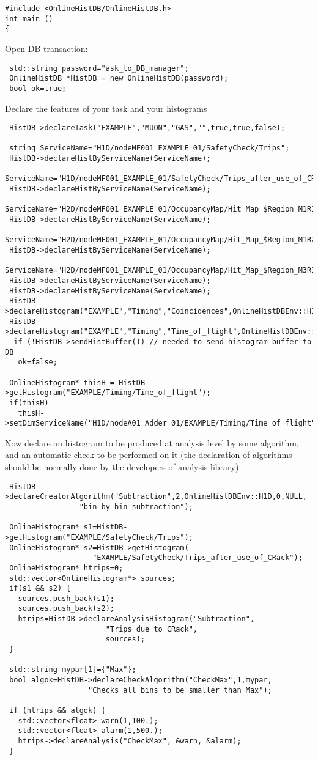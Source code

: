 \documentclass{lhcbnote}
\begin{document}
\begin{verbatim}
#include <OnlineHistDB/OnlineHistDB.h>
int main ()
{
\end{verbatim}
Open DB transaction:
\begin{verbatim}
 std::string password="ask_to_DB_manager";
 OnlineHistDB *HistDB = new OnlineHistDB(password);
 bool ok=true;
\end{verbatim}
Declare the features of your task and your histograms
\begin{verbatim}
 HistDB->declareTask("EXAMPLE","MUON","GAS","",true,true,false);

 string ServiceName="H1D/nodeMF001_EXAMPLE_01/SafetyCheck/Trips";
 HistDB->declareHistByServiceName(ServiceName);
 ServiceName="H1D/nodeMF001_EXAMPLE_01/SafetyCheck/Trips_after_use_of_CRack";
 HistDB->declareHistByServiceName(ServiceName);
 ServiceName="H2D/nodeMF001_EXAMPLE_01/OccupancyMap/Hit_Map_$Region_M1R1";
 HistDB->declareHistByServiceName(ServiceName); 
 ServiceName="H2D/nodeMF001_EXAMPLE_01/OccupancyMap/Hit_Map_$Region_M1R2";
 HistDB->declareHistByServiceName(ServiceName);
 ServiceName="H2D/nodeMF001_EXAMPLE_01/OccupancyMap/Hit_Map_$Region_M3R1";
 HistDB->declareHistByServiceName(ServiceName);
 HistDB->declareHistByServiceName(ServiceName);
 HistDB->declareHistogram("EXAMPLE","Timing","Coincidences",OnlineHistDBEnv::H1D);
 HistDB->declareHistogram("EXAMPLE","Timing","Time_of_flight",OnlineHistDBEnv::H1D);
  if (!HistDB->sendHistBuffer()) // needed to send histogram buffer to DB
   ok=false;

 OnlineHistogram* thisH = HistDB->getHistogram("EXAMPLE/Timing/Time_of_flight");
 if(thisH)
   thisH->setDimServiceName("H1D/nodeA01_Adder_01/EXAMPLE/Timing/Time_of_flight");
\end{verbatim}
Now declare an histogram to be produced at analysis level by some
algorithm, and an automatic check to be performed on it (the
declaration of algorithms should be normally done by the developers of analysis
library)  
\begin{verbatim}
 HistDB->declareCreatorAlgorithm("Subtraction",2,OnlineHistDBEnv::H1D,0,NULL,
				 "bin-by-bin subtraction");

 OnlineHistogram* s1=HistDB->getHistogram("EXAMPLE/SafetyCheck/Trips");
 OnlineHistogram* s2=HistDB->getHistogram(
                    "EXAMPLE/SafetyCheck/Trips_after_use_of_CRack");
 OnlineHistogram* htrips=0;
 std::vector<OnlineHistogram*> sources;
 if(s1 && s2) {
   sources.push_back(s1);
   sources.push_back(s2);
   htrips=HistDB->declareAnalysisHistogram("Subtraction",
					   "Trips_due_to_CRack",
					   sources);
 }

 std::string mypar[1]={"Max"};
 bool algok=HistDB->declareCheckAlgorithm("CheckMax",1,mypar,
			       "Checks all bins to be smaller than Max");
 
 if (htrips && algok) {
   std::vector<float> warn(1,100.);
   std::vector<float> alarm(1,500.);
   htrips->declareAnalysis("CheckMax", &warn, &alarm);
 } 
\end{verbatim}
\end{document}
